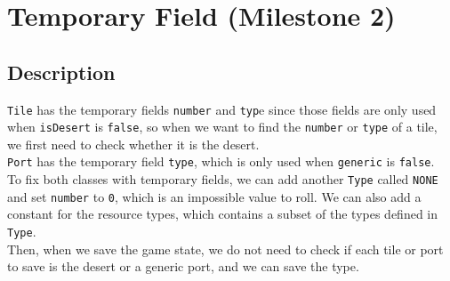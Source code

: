 \documentclass{fank1basedocument}
\begin{document}
\section*{Temporary Field (Milestone 2)}
\subsection*{Description}
\texttt{Tile} has the temporary fields \texttt{number} and \texttt{typ}e since those fields are only used when \texttt{isDesert} is \texttt{false}, so when we want to ﬁnd the \texttt{number} or \texttt{type} of a tile, we ﬁrst need to check whether it is the desert.\\

\texttt{Port} has the temporary field \texttt{type}, which is only used when \texttt{generic} is \texttt{false}.\\

To fix both classes with temporary fields, we can add another \texttt{Type} called \texttt{NONE} and set \texttt{number} to \texttt{0}, which is an impossible value to roll. We can also add a constant for the resource types, which contains a subset of the types deﬁned in \texttt{Type}.\\

Then, when we save the game state, we do not need to check if each tile or port to save is the desert or a generic port, and we can save the type.
\end{document}
